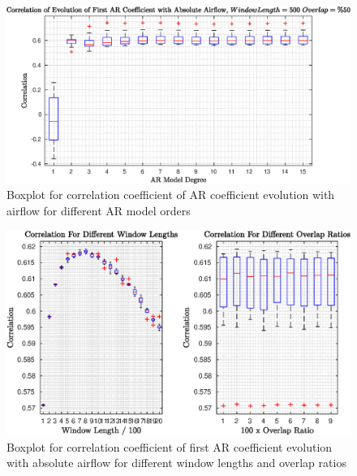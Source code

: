 \begin{figure}
	\begin{center}
		\includegraphics[width=\textwidth]{figures/corr_abs_for_ar_model_degree_selection.eps}
		\caption{Boxplot for correlation coefficient of AR coefficient evolution with airflow for different AR model orders}
		\label{fig:abs_airflow_window_ar_model}
	\end{center}
\end{figure}
\begin{figure}
	\begin{center}
		\includegraphics[width=\textwidth]{figures/corr_abs_for_window_length_selection.eps}
		\caption{Boxplot for correlation coefficient of first AR coefficient evolution with absolute airflow for different window lengths and overlap ratios}
		\label{fig:abs_airflow_window_ar_model_window_overlap}
	\end{center}
\end{figure}\par
